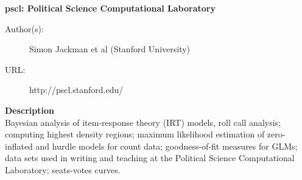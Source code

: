 \documentclass[MASTER.tex]{subfiles}
\begin{document}
\begin{frame}
	\textbf{pscl: Political Science Computational Laboratory} %

\begin{description}
	\item[Author(s):] Simon Jackman et al (Stanford University)
	\item[URL:] http://pscl.stanford.edu/
\end{description}\bigskip

\textbf{Description}\\
Bayesian analysis of item-response theory (IRT) models, roll call analysis; computing highest density regions; maximum likelihood estimation of zero-inflated and hurdle models for count data; goodness-of-fit measures for GLMs; data sets used in writing and teaching at the Political Science Computational Laboratory; seats-votes curves.
\end{frame}
\end{document}
